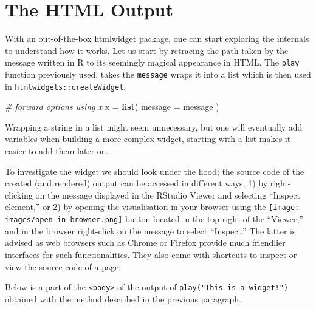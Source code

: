 \documentclass[10pt,]{krantz}
\makeatletter
\newenvironment{Shaded}{\begin{snugshade}}{\end{snugshade}}
\newcommand{\CommentTok}[1]{\textcolor[rgb]{0.37,0.37,0.37}{\textit{#1}}}
\newcommand{\DataTypeTok}[1]{\textcolor[rgb]{0.27,0.27,0.27}{#1}}
\newcommand{\KeywordTok}[1]{\textcolor[rgb]{0.27,0.27,0.27}{\textbf{#1}}}
\newcommand{\NormalTok}[1]{#1}
\newcommand{\StringTok}[1]{\textcolor[rgb]{0.5,0.5,0.5}{#1}}
\newenvironment{kframe}{%
\medskip{}
\setlength{\fboxsep}{.8em}
 \def\at@end@of@kframe{}%
 \ifinner\ifhmode%
  \def\at@end@of@kframe{\end{minipage}}%
  \begin{minipage}{\columnwidth}%
 \fi\fi%
 \def\FrameCommand##1{\hskip\@totalleftmargin \hskip-\fboxsep
 \colorbox{shadecolor}{##1}\hskip-\fboxsep
     \hskip-\linewidth \hskip-\@totalleftmargin \hskip\columnwidth}%
 \MakeFramed {\advance\hsize-\width
   \@totalleftmargin\z@ \linewidth\hsize
   \@setminipage}}%
 {\par\unskip\endMakeFramed%
 \at@end@of@kframe}
\renewenvironment{Shaded}{\begin{kframe}}{\end{kframe}}
\makeatother
\begin{document}
\hypertarget{widgets-first-htmloutput}{%
\section{The HTML Output}\label{widgets-first-htmloutput}}

With an out-of-the-box htmlwidget package, one can start exploring the internals to understand how it works. Let us start by retracing the path taken by the message written in R to its seemingly magical appearance in HTML. The \texttt{play} function previously used, takes the \texttt{message} wraps it into a list which is then used in \texttt{htmlwidgets::createWidget}.

\begin{Shaded}
\begin{Highlighting}[]
\CommentTok{# forward options using x}
\NormalTok{x =}\StringTok{ }\KeywordTok{list}\NormalTok{(}
  \DataTypeTok{message =}\NormalTok{ message}
\NormalTok{)}
\end{Highlighting}
\end{Shaded}

Wrapping a string in a list might seem unnecessary, but one will eventually add variables when building a more complex widget, starting with a list makes it easier to add them later on.

To investigate the widget we should look under the hood; the source code of the created (and rendered) output can be accessed in different ways, 1) by right-clicking on the message displayed in the RStudio Viewer and selecting ``Inspect element,'' or 2) by opening the visualisation in your browser using the \texttt{[image: images/open-in-browser.png]} button located in the top right of the ``Viewer,'' and in the browser right-click on the message to select ``Inspect.'' The latter is advised as web browsers such as Chrome or Firefox provide much friendlier interfaces for such functionalities. They also come with shortcuts to inspect or view the source code of a page.

Below is a part of the \texttt{\textless{}body\textgreater{}} of the output of \texttt{play("This\ is\ a\ widget!")} obtained with the method described in the previous paragraph.
\end{document}
